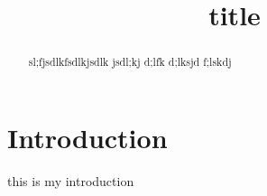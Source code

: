 \documentclass[conference]{IEEEconf}
\title{title}
\begin{document}
\maketitle

\begin{abstract}
sl;fjsdlkfsdlkjsdlk jsdl;kj d;lfk d;lksjd f;lskdj 
\end{abstract}

\section{Introduction}
this is my introduction
\end{document}
